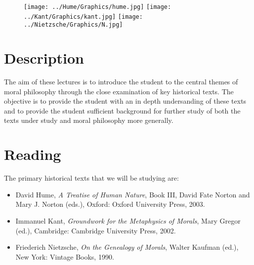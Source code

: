 \documentclass[12pt]{article}
\title{\mytitle}%
\author{\myauthor}
\date{} %
\begin{document}
\maketitle

\setlength{\parindent}{1em}


\begin{figure}[htbp]
    \centering
        \texttt{[image: ../Hume/Graphics/hume.jpg]}
        \texttt{[image: ../Kant/Graphics/kant.jpg]}
        \texttt{[image: ../Nietzsche/Graphics/N.jpg]}
    \label{fig:Pictures_kant}
\end{figure}

\section{Description}\label{sec:description} %

The aim of these lectures is to introduce the student to the central themes of moral philosophy through the close examination of key historical texts. The objective is to provide the student with an in depth undersanding of these texts and to provide the student sufficient background for further study of both the texts under study and moral philosophy more generally.


\section{Reading}\label{sec:reading} %

The primary historical texts that we will be studying are:
\begin{itemize}
    \item David Hume, \emph{A Treatise of Human Nature}, Book III, David Fate Norton and Mary J. Norton (eds.), Oxford: Oxford University Press, 2003.
    \item Immanuel Kant, \emph{Groundwork for the Metaphysics of Morals}, Mary Gregor (ed.), Cambridge: Cambridge University Press, 2002.
    \item Friederich Nietzsche, \emph{On the Genealogy of Morals}, Walter Kaufman (ed.), New York: Vintage Books, 1990.
\end{itemize}
\end{document}
